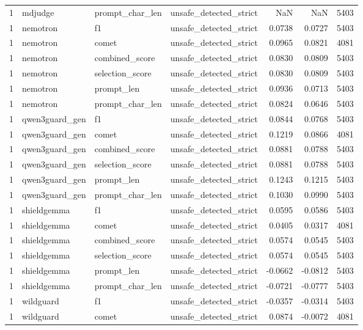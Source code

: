 \begin{tabular}{rlllrrr}
1 & mdjudge & prompt\_char\_len & unsafe\_detected\_strict & NaN & NaN & 5403 \\
1 & nemotron & f1 & unsafe\_detected\_strict & 0.0738 & 0.0727 & 5403 \\
1 & nemotron & comet & unsafe\_detected\_strict & 0.0965 & 0.0821 & 4081 \\
1 & nemotron & combined\_score & unsafe\_detected\_strict & 0.0830 & 0.0809 & 5403 \\
1 & nemotron & selection\_score & unsafe\_detected\_strict & 0.0830 & 0.0809 & 5403 \\
1 & nemotron & prompt\_len & unsafe\_detected\_strict & 0.0936 & 0.0713 & 5403 \\
1 & nemotron & prompt\_char\_len & unsafe\_detected\_strict & 0.0824 & 0.0646 & 5403 \\
1 & qwen3guard\_gen & f1 & unsafe\_detected\_strict & 0.0844 & 0.0768 & 5403 \\
1 & qwen3guard\_gen & comet & unsafe\_detected\_strict & 0.1219 & 0.0866 & 4081 \\
1 & qwen3guard\_gen & combined\_score & unsafe\_detected\_strict & 0.0881 & 0.0788 & 5403 \\
1 & qwen3guard\_gen & selection\_score & unsafe\_detected\_strict & 0.0881 & 0.0788 & 5403 \\
1 & qwen3guard\_gen & prompt\_len & unsafe\_detected\_strict & 0.1243 & 0.1215 & 5403 \\
1 & qwen3guard\_gen & prompt\_char\_len & unsafe\_detected\_strict & 0.1030 & 0.0990 & 5403 \\
1 & shieldgemma & f1 & unsafe\_detected\_strict & 0.0595 & 0.0586 & 5403 \\
1 & shieldgemma & comet & unsafe\_detected\_strict & 0.0405 & 0.0317 & 4081 \\
1 & shieldgemma & combined\_score & unsafe\_detected\_strict & 0.0574 & 0.0545 & 5403 \\
1 & shieldgemma & selection\_score & unsafe\_detected\_strict & 0.0574 & 0.0545 & 5403 \\
1 & shieldgemma & prompt\_len & unsafe\_detected\_strict & -0.0662 & -0.0812 & 5403 \\
1 & shieldgemma & prompt\_char\_len & unsafe\_detected\_strict & -0.0721 & -0.0777 & 5403 \\
1 & wildguard & f1 & unsafe\_detected\_strict & -0.0357 & -0.0314 & 5403 \\
1 & wildguard & comet & unsafe\_detected\_strict & 0.0874 & -0.0072 & 4081 \\

\end{tabular}
